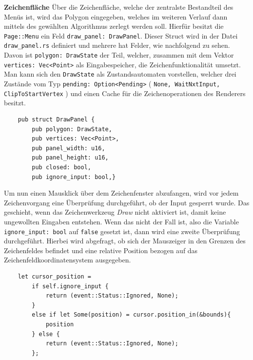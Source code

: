 \textbf{Zeichenfläche}\linebreak
Über die Zeichenfläche, welche der zentralste Bestandteil des Menüs ist, wird das Polygon eingegeben, welches im weiteren Verlauf dann mittels des gewählten Algorithmus zerlegt werden soll.
Hierfür besitzt die \lstinline{Page::Menu} ein Feld \lstinline{draw_panel: DrawPanel}. Dieser Struct wird in der Datei \lstinline{draw_panel.rs} definiert und mehrere hat Felder, wie nachfolgend zu sehen. 
Davon ist \lstinline{polygon: DrawState} der Teil, welcher, zusammen mit dem Vektor \lstinline{vertices: Vec<Point>} als Eingabespeicher, die Zeichenfunktionalität umsetzt. Man kann sich den \lstinline{DrawState} als Zustandsautomaten 
vorstellen, welcher drei Zustände vom Typ \lstinline{pending: Option<Pending>} ( \lstinline{None, WaitNxtInput, ClipToStartVertex} ) und einen Cache für die Zeichenoperationen des Renderers besitzt. 

\begin{lstlisting}
    pub struct DrawPanel {
        pub polygon: DrawState,
        pub vertices: Vec<Point>,
        pub panel_width: u16,
        pub panel_height: u16,
        pub closed: bool,
        pub ignore_input: bool,}
\end{lstlisting}

Um nun einen Mausklick über dem Zeichenfenster abzufangen, wird vor jedem Zeichenvorgang eine Überprüfung durchgeführt, ob der Input gesperrt wurde. Das geschieht, wenn 
das Zeichenwerkzeug \emph{Draw} nicht aktiviert ist, damit keine ungewollten Eingaben entstehen. Wenn das nicht der Fall ist, also die Variable \lstinline{ignore_input: bool} auf \lstinline{false} gesetzt ist, dann 
wird eine zweite Überprüfung durchgeführt. Hierbei wird abgefragt, ob sich der Mauszeiger in den Grenzen des Zeichenfeldes befindet und eine relative Position bezogen auf das Zeichenfeldkoordinatensystem ausgegeben.

\begin{lstlisting}
    let cursor_position =
        if self.ignore_input {
            return (event::Status::Ignored, None);
        }
        else if let Some(position) = cursor.position_in(&bounds){
            position
        } else {
            return (event::Status::Ignored, None);
        };

\end{lstlisting}

